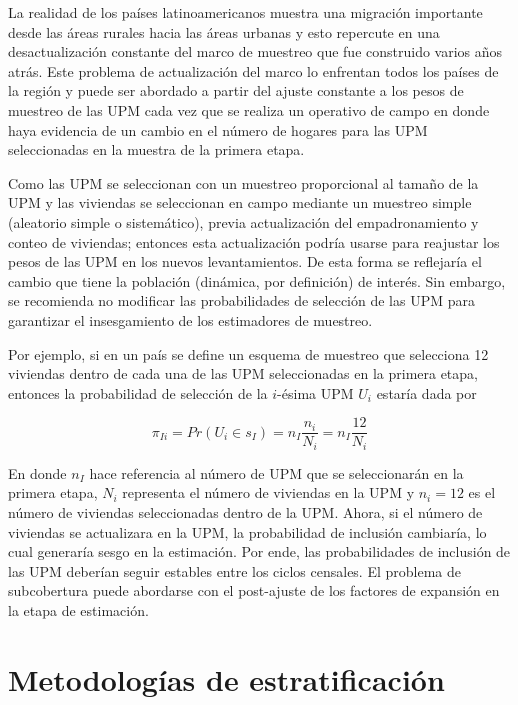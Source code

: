 \documentclass[
  12pt,
  spanish,
]{book}
\begin{document}
La realidad de los países latinoamericanos muestra una migración importante desde las áreas rurales hacia las áreas urbanas y esto repercute en una desactualización constante del marco de muestreo que fue construido varios años atrás. Este problema de actualización del marco lo enfrentan todos los países de la región y puede ser abordado a partir del ajuste constante a los pesos de muestreo de las UPM cada vez que se realiza un operativo de campo en donde haya evidencia de un cambio en el número de hogares para las UPM seleccionadas en la muestra de la primera etapa.

Como las UPM se seleccionan con un muestreo proporcional al tamaño de la UPM y las viviendas se seleccionan en campo mediante un muestreo simple (aleatorio simple o sistemático), previa actualización del empadronamiento y conteo de viviendas; entonces esta actualización podría usarse para reajustar los pesos de las UPM en los nuevos levantamientos. De esta forma se reflejaría el cambio que tiene la población (dinámica, por definición) de interés. Sin embargo, se recomienda no modificar las probabilidades de selección de las UPM para garantizar el insesgamiento de los estimadores de muestreo.

Por ejemplo, si en un país se define un esquema de muestreo que selecciona 12 viviendas dentro de cada una de las UPM seleccionadas en la primera etapa, entonces la probabilidad de selección de la \(i\)-ésima UPM \(U_i\) estaría dada por

\[
\pi_{Ii}=Pr(U_i \in s_I)=n_I\frac{n_i}{N_i}=n_I\frac{12}{N_i}
\]

En donde \(n_I\) hace referencia al número de UPM que se seleccionarán en la primera etapa, \(N_i\) representa el número de viviendas en la UPM y \(n_i=12\) es el número de viviendas seleccionadas dentro de la UPM. Ahora, si el número de viviendas se actualizara en la UPM, la probabilidad de inclusión cambiaría, lo cual generaría sesgo en la estimación. Por ende, las probabilidades de inclusión de las UPM deberían seguir estables entre los ciclos censales. El problema de subcobertura puede abordarse con el post-ajuste de los factores de expansión en la etapa de estimación.

\hypertarget{metodologuxedas-de-estratificaciuxf3n}{%
\chapter{Metodologías de estratificación}\label{metodologuxedas-de-estratificaciuxf3n}}
\end{document}
